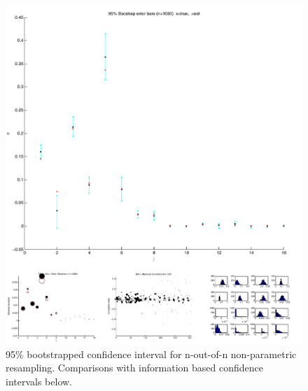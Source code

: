 \documentclass[12pt]{amsart}
\begin{document}
\begin{figure}[h!]
  \centering
    \includegraphics[width=1.1\textwidth]{mn_bootstrap.pdf}
    \caption{95\% bootstrapped confidence interval for n-out-of-n non-parametric resampling. Comparisons with information based confidence intervals below.}
\end{figure}
\end{document}
